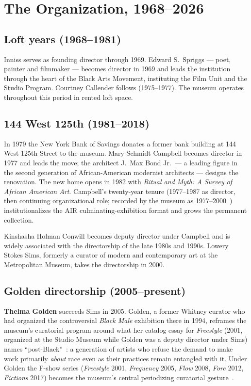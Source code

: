 \documentclass[10pt,letterpaper,twocolumn]{article}
\begin{document}
\section{The Organization, 1968--2026}

\subsection{Loft years (1968--1981)}

Inniss serves as founding director through 1969. Edward S.~Spriggs --- poet, painter and filmmaker --- becomes director in 1969 and leads the institution through the heart of the Black Arts Movement, instituting the Film Unit and the Studio Program. Courtney Callender follows (1975--1977). The museum operates throughout this period in rented loft space.

\subsection{144 West 125th (1981--2018)}

In 1979 the New York Bank of Savings donates a former bank building at 144 West 125th Street to the museum. Mary Schmidt Campbell becomes director in 1977 and leads the move; the architect J.~Max Bond Jr.~--- a leading figure in the second generation of African-American modernist architects --- designs the renovation. The new home opens in 1982 with \emph{Ritual and Myth: A Survey of African American Art}. Campbell's twenty-year tenure (1977--1987 as director, then continuing organizational role; recorded by the museum as 1977--2000~\citep{smh2026history}) institutionalizes the AIR culminating-exhibition format and grows the permanent collection.

Kinshasha Holman Conwill becomes deputy director under Campbell and is widely associated with the directorship of the late 1980s and 1990s. Lowery Stokes Sims, formerly a curator of modern and contemporary art at the Metropolitan Museum, takes the directorship in 2000.

\subsection{Golden directorship (2005--present)}

\textbf{Thelma Golden} succeeds Sims in 2005. Golden, a former Whitney curator who had organized the controversial \emph{Black Male} exhibition there in 1994, reframes the museum's curatorial program around what her catalog essay for \emph{Freestyle} (2001, organized at the Studio Museum while Golden was a deputy director under Sims) names ``post-Black''~\citep{golden2001freestyle}: a generation of artists who refuse the demand to make work primarily \emph{about} race even as their practices remain entangled with it. Under Golden the F-show series (\emph{Freestyle} 2001, \emph{Frequency} 2005, \emph{Flow} 2008, \emph{Fore} 2012, \emph{Fictions} 2017) becomes the museum's central periodizing curatorial gesture~\citep{artsy2017fictions}.
\end{document}
